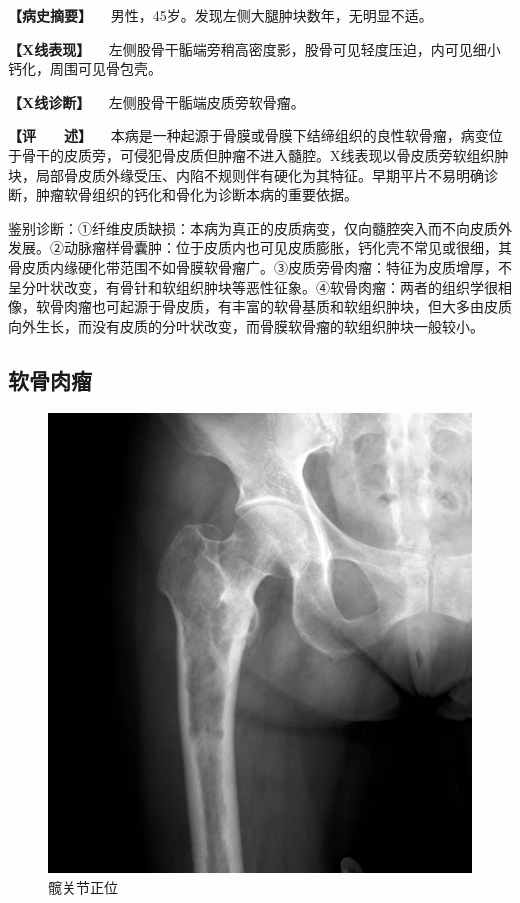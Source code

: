 \textbf{【病史摘要】} 　男性，45岁。发现左侧大腿肿块数年，无明显不适。

\textbf{【X线表现】}
　左侧股骨干骺端旁稍高密度影，股骨可见轻度压迫，内可见细小钙化，周围可见骨包壳。

\textbf{【X线诊断】} 　左侧股骨干骺端皮质旁软骨瘤。

\textbf{【评　　述】}
　本病是一种起源于骨膜或骨膜下结缔组织的良性软骨瘤，病变位于骨干的皮质旁，可侵犯骨皮质但肿瘤不进入髓腔。X线表现以骨皮质旁软组织肿块，局部骨皮质外缘受压、内陷不规则伴有硬化为其特征。早期平片不易明确诊断，肿瘤软骨组织的钙化和骨化为诊断本病的重要依据。

鉴别诊断：①纤维皮质缺损：本病为真正的皮质病变，仅向髓腔突入而不向皮质外发展。②动脉瘤样骨囊肿：位于皮质内也可见皮质膨胀，钙化壳不常见或很细，其骨皮质内缘硬化带范围不如骨膜软骨瘤广。③皮质旁骨肉瘤：特征为皮质增厚，不呈分叶状改变，有骨针和软组织肿块等恶性征象。④软骨肉瘤：两者的组织学很相像，软骨肉瘤也可起源于骨皮质，有丰富的软骨基质和软组织肿块，但大多由皮质向外生长，而没有皮质的分叶状改变，而骨膜软骨瘤的软组织肿块一般较小。

\subsection{软骨肉瘤}

\begin{figure}[!htbp]
 \centering
 \includegraphics{./images/Image00092.jpg}
 \captionsetup{justification=centering}
 \caption{髋关节正位}
 \label{fig2-7-7}
  \end{figure} 

